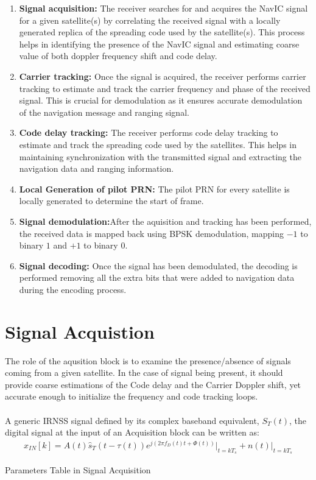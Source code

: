 \begin{enumerate}
	\item \textbf{Signal acquisition:} The receiver searches for and acquires the NavIC signal for a given satellite(s) by correlating the received signal with a locally generated replica of the spreading code used by the satellite(s). This process helps in identifying the presence of the NavIC signal and estimating coarse value of both doppler frequency shift and code delay.
\item \textbf{Carrier tracking:} Once the signal is acquired, the receiver performs carrier tracking to estimate and track the carrier frequency and phase of the received signal. This is crucial for demodulation as it ensures accurate demodulation of the navigation message and ranging signal.
\item \textbf{Code delay tracking:} The receiver performs code delay tracking to estimate and track the spreading code used by the satellites. This helps in maintaining synchronization with the transmitted signal and extracting the navigation data and ranging information.
\item \textbf{Local Generation of pilot PRN:} The pilot PRN for every satellite is locally generated to determine the start of frame.
\item \textbf{Signal demodulation:}After the aquisition and tracking has been performed, the received data is mapped back using BPSK demodulation, mapping $-1$ to binary $1$ and $+1$ to binary $0$.
\item \textbf{Signal decoding:} Once the signal has been demodulated, the decoding is performed removing all the extra bits that were added to navigation data during the encoding process.
\end{enumerate}

\section{Signal Acquistion}
The role of the aqusition block is to examine the presence/absence of signals coming from a given satellite. In the case of signal being present, it should provide coarse estimations of the Code delay and the Carrier Doppler shift, yet accurate enough to initialize the frequency and code tracking loops.
\\
\\
A generic IRNSS signal defined by its complex baseband equivalent, 
$S_T(t)$, the digital signal at the input of an Acquisition block can be written as:
\begin{align}
	x_{IN}[k]=A(t)\hat s_T (t-\tau(t))e^{j(2 \pi f_D(t)t+\Phi(t))}\bigg|_{t=kT_s} +n(t)\bigg|_{t=kT_s}
\end{align}
\begin{table}[h]

\vspace{3mm}
\caption{Parameters Table in Signal Acquisition}
\label{table:table_para}
\end{table}

